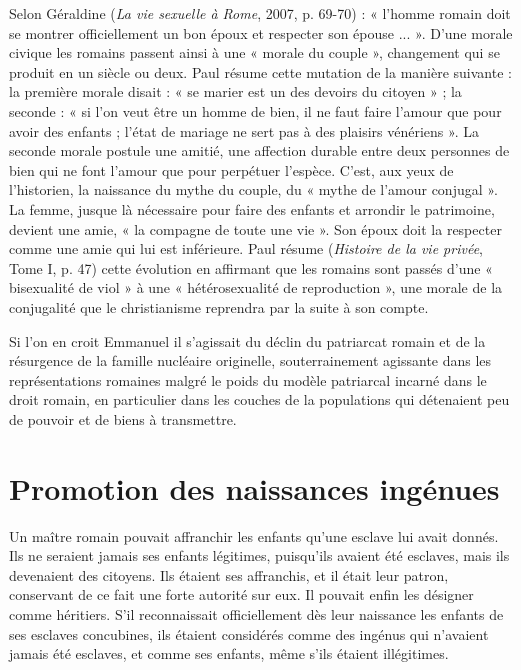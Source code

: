 %
 Selon Géraldine  (\emph{La vie sexuelle à Rome}, 2007, p. 69-70) : « l'homme romain doit se montrer officiellement un bon époux et respecter son épouse ... ». D'une morale civique les romains passent ainsi à une « morale du couple », changement qui se produit en un siècle ou deux. Paul  résume cette mutation de la manière suivante : la première morale disait : « se marier est un des devoirs du citoyen » ; la seconde : « si l'on veut être un homme de bien, il ne faut faire l'amour que pour avoir des enfants ; l'état de mariage ne sert pas à des plaisirs vénériens ». La seconde morale postule une amitié, une affection durable entre deux personnes de bien qui ne font l'amour que pour perpétuer l'espèce. C'est, aux yeux de l'historien, la naissance du mythe du couple, du « mythe de l'amour conjugal ». La femme, jusque là nécessaire pour faire des enfants et arrondir le patrimoine, devient une amie, « la compagne de toute une vie ». Son époux doit la respecter comme une amie qui lui est inférieure. Paul  résume (\emph{Histoire de la vie privée}, Tome I, p. 47) cette évolution en affirmant que les romains sont passés d'une « bisexualité de viol » à une « hétérosexualité de reproduction », une morale de la conjugalité que le christianisme reprendra par la suite à son compte.

 Si l'on en croit Emmanuel  il s'agissait du déclin du patriarcat romain et de la résurgence de la famille nucléaire originelle, souterrainement agissante dans les représentations romaines malgré le poids du modèle patriarcal incarné dans le droit romain, en particulier dans les couches de la populations qui détenaient peu de pouvoir et de biens à transmettre. 

\section{Promotion des naissances ingénues}

 Un maître romain pouvait affranchir les enfants qu'une esclave lui avait donnés. Ils ne seraient jamais ses enfants légitimes, puisqu'ils avaient été esclaves, mais ils devenaient des citoyens. Ils étaient ses affranchis, et il était leur patron, conservant de ce fait une forte autorité sur eux. Il pouvait enfin les désigner comme héritiers. S'il reconnaissait officiellement dès leur naissance les enfants de ses esclaves concubines, ils étaient considérés comme des ingénus qui n'avaient jamais été esclaves, et comme ses enfants, même s'ils étaient illégitimes. 

